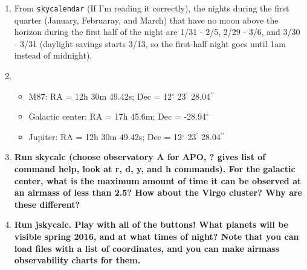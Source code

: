 \documentclass[12pt]{article}
\begin{document}
\begin{enumerate}[1.]
    \item From \texttt{skycalendar} (If I'm reading it correctly),
        the nights during the first quarter (January, Februaray, and
        March) that have no moon above the horizon during the
        first half of the night are 1/31 - 2/5, 2/29 - 3/6, and 3/30 -
        3/31 (daylight savings starts 3/13, so the first-half night
        goes until 1am instead of midnight).

    \item  
        \begin{itemize}
            \item M87:
            RA = 12h 30m 49.42s;
            Dec = 12$^{\circ}$ 23$^{\prime}$ 28.04$^{\prime\prime}$
            \item Galactic center:
            RA = 17h 45.6m;
            Dec = -28.94$^{\circ}$
            \item Jupiter:
            RA = 12h 30m 49.42s;
            Dec = 12$^{\circ}$ 23$^{\prime}$ 28.04$^{\prime\prime}$
        \end{itemize}

    \item \textbf{Run skycalc (choose observatory A for APO, ? gives
    list of command help, look at r, d, y, and h commands). For the
    galactic center, what is the maximum amount of time it can be
    observed at an airmass of less than 2.5? How about the Virgo
    cluster? Why are these different?}

    \item \textbf{Run jskycalc. Play with all of the buttons! What
    planets will be visible spring 2016, and at what times of night?
    Note that you can load files with a list of coordinates, and you
    can make airmass observability charts for them.}


\end{enumerate}
\end{document}
